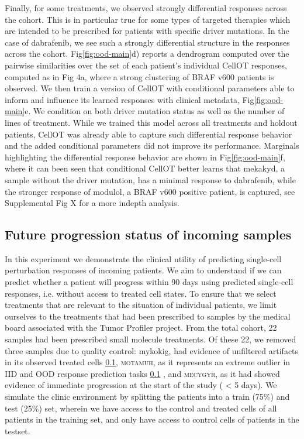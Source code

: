Finally, for some treatments, we observed strongly differential responses across the cohort.
This is in particular true for some types of targeted therapies which are intended to be prescribed for patients with specific driver mutations.
In the case of dabrafenib, we see such a strongly differential structure in the responses across the cohort.
Fig\ref{fig:ood-main}d) reports a dendrogram computed over the pairwise similarities over the set of each patient’s individual CellOT responses, computed as in Fig 4a, where a strong clustering of BRAF v600 patients is observed.
We then train a version of CellOT with conditional parameters \cite{} able to inform and influence its learned responses with clinical metadata, Fig\ref{fig:ood-main}e.
We condition on both driver mutation status as well as the number of lines of treatment.
While we trained this model across all treatments and holdout patients,
CellOT was already able to capture such differential response behavior and the added conditional parameters did not improve its performance.
Marginals highlighting the differential response behavior are shown in Fig\ref{fig:ood-main}f, where it can been seen that conditional CellOT better learns that mekakyd, a sample without the driver mutation, has a minimal response to dabrafenib, while the stronger response of modulol, a BRAF v600 positive patient, is captured, see Supplemental Fig X for a more indepth analysis.


\subsection{Future progression status of incoming samples}
In this experiment we demonstrate the clinical utility of predicting single-cell perturbation responses of incoming patients.
We aim to understand if we can predict whether a patient will progress within 90 days using predicted single-cell responses, i.e. without access to treated cell states.
To ensure that we select treatments that are relevant to the situation of individual patients, we limit ourselves to the treatments that had been prescribed to samples by the medical board associated with the Tumor Profiler project.
From the total cohort, 22 samples had been prescribed small molecule treatments.
Of these 22, we removed three samples due to quality control: mykokig, had evidence of unfiltered artifacts in its observed treated cells \ref{}, \textsc{motamuh}, as it represents an extreme outlier in IID and OOD response prediction tasks \ref{} , and \textsc{mecygyr}, as it had showed evidence of immediate progression at the start of the study ( < 5 days).
We simulate the clinic environment by splitting the patients into a train (75\%) and test (25\%) set, wherein we have access to the control and treated cells of all patients in the training set, and only have access to control cells of patients in the testset.

